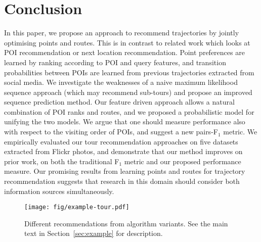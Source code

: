 \section{Conclusion}
\label{sec:conclusion}

In this paper, we propose an approach to recommend trajectories
by jointly optimising points and routes.
This is in contrast to related work which looks at
POI recommendation or next location recommendation.
Point preferences are learned by ranking according to POI and query features,
and transition probabilities between POIs are learned from previous trajectories extracted
from social media.
We investigate the weaknesses of a naive maximum likelihood sequence approach (which
may recommend sub-tours) and propose an improved sequence prediction method.
Our feature driven approach allows a natural combination of POI ranks and routes,
and we proposed a probabilistic model 
for unifying the two models.
We argue that one should measure performance also with respect to the visiting order of POIs, 
and suggest a new pairs-F$_1$ metric.
We empirically evaluated our tour recommendation approaches on five datasets extracted from
Flickr photos, and demonstrate that our method improves on prior work, on both the traditional
F$_1$ metric and our proposed performance measure.
Our promising results from learning points and routes for trajectory recommendation suggests
that research in this domain should consider both information sources simultaneously.


\begin{figure*}[t]
	\centering
	\texttt{[image: fig/example-tour.pdf]}
	\caption{Different recommendations from algorithm variants.
    See the main text in Section~\ref{sec:example} for description.}
	\label{fig:exampleresult}
	\captionmoveup
\end{figure*}



